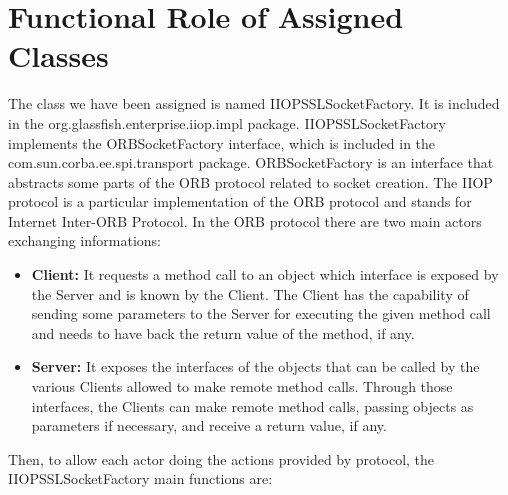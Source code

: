 \section{Functional Role of Assigned Classes}

The class we have been assigned is named IIOPSSLSocketFactory.
It is included in the org.glassfish.enterprise.iiop.impl package.
IIOPSSLSocketFactory implements the ORBSocketFactory interface, which is included in the com.sun.corba.ee.spi.transport package.
ORBSocketFactory is an interface that abstracts some parts of the ORB protocol related to socket creation.
The IIOP protocol is a particular implementation of the ORB protocol and stands for Internet Inter-ORB Protocol. 
In the ORB protocol there are two main actors exchanging informations:
\begin{itemize}
	\item \textbf{Client:} It requests a method call to an object which interface is exposed by the Server and is known by the Client.
	The Client has the capability of sending some parameters to the Server for executing the given method call and needs to have back the return value of the method, if any.
	\item \textbf{Server:} It exposes the interfaces of the objects that can be called by the various Clients allowed to make remote method calls.
	Through those interfaces, the Clients can make remote method calls, passing objects as parameters if necessary, and receive a return value, if any.
\end{itemize}
Then, to allow each actor doing the actions provided by protocol, the IIOPSSLSocketFactory main functions are:
